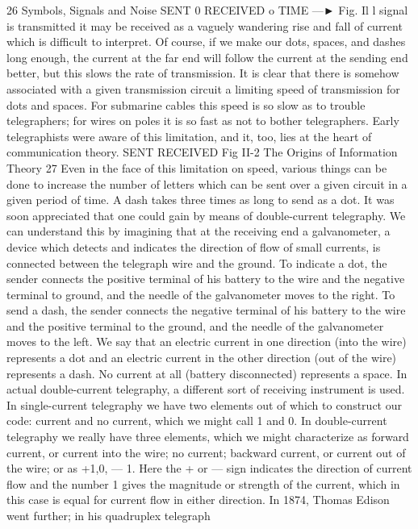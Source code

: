 26 Symbols, Signals and Noise
SENT
0
RECEIVED
o TIME —►
Fig. Il l
signal is transmitted it may be received as a vaguely wandering
rise and fall of current which is difficult to interpret.
Of course, if we make our dots, spaces, and dashes long enough,
the current at the far end will follow the current at the sending end
better, but this slows the rate of transmission. It is clear that there
is somehow associated with a given transmission circuit a limiting
speed of transmission for dots and spaces. For submarine cables
this speed is so slow as to trouble telegraphers; for wires on poles
it is so fast as not to bother telegraphers. Early telegraphists were
aware of this limitation, and it, too, lies at the heart of communication
theory.
SENT
RECEIVED
Fig II-2
The Origins of Information Theory
27
Even in the face of this limitation on speed, various things can
be done to increase the number of letters which can be sent over
a given circuit in a given period of time. A dash takes three times
as long to send as a dot. It was soon appreciated that one could
gain by means of double-current telegraphy. We can understand
this by imagining that at the receiving end a galvanometer, a
device which detects and indicates the direction of flow of small
currents, is connected between the telegraph wire and the ground.
To indicate a dot, the sender connects the positive terminal of his
battery to the wire and the negative terminal to ground, and the
needle of the galvanometer moves to the right. To send a dash, the
sender connects the negative terminal of his battery to the wire and
the positive terminal to the ground, and the needle of the galvanometer
moves to the left. We say that an electric current in one
direction (into the wire) represents a dot and an electric current
in the other direction (out of the wire) represents a dash. No
current at all (battery disconnected) represents a space. In actual
double-current telegraphy, a different sort of receiving instrument
is used.
In single-current telegraphy we have two elements out of which
to construct our code: current and no current, which we might call
1 and 0. In double-current telegraphy we really have three elements,
which we might characterize as forward current, or current into
the wire; no current; backward current, or current out of the wire;
or as +1,0, — 1. Here the + or — sign indicates the direction of
current flow and the number 1 gives the magnitude or strength of
the current, which in this case is equal for current flow in either
direction.
In 1874, Thomas Edison went further; in his quadruplex telegraph
